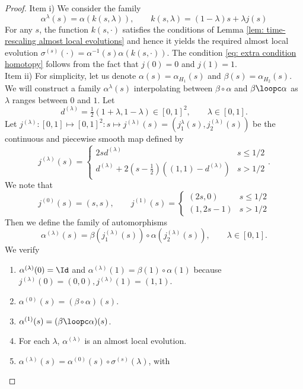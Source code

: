 \begin{proof}
	Item i)  We consider the family
	$$
	\alpha^{\lambda}(s) =      \alpha( k(s,\lambda)), \qquad   k(s,\lambda)=  (1-\lambda)s+ \lambda j(s)
	$$
	For any $s$, the function $k(s,\cdot)$ satisfies the conditions of Lemma \ref{lem: time-rescaling almost local evolutions} and hence it yields the required almost local evolution 
	$\sigma^{(s)}(\cdot)=\alpha^{-1}(s) \alpha(k(s,\cdot))$.
	The condition \eqref{eq: extra condition homotopy} follows from the fact that $j(0)=0$ and $j(1)=1$.\\
	Item ii)  For simplicity, let us denote $\alpha(s)=\alpha_{H_1}(s)$ and $\beta(s)=\alpha_{H_2}(s)$.
	We will construct a family $\alpha^\lambda(s)$ interpolating between $\beta\circ\alpha$ and $\beta \loopc \alpha$ as $\lambda$ ranges between $0$ and $1$. Let 
	$$
	d^{(\lambda)}=\tfrac{1}{2}(1+\lambda,1-\lambda) \in [0,1]^2,\qquad \lambda\in[0,1].
	$$
	Let $j^{(\lambda)}: [0,1] \mapsto [0,1]^2:  s \mapsto j^{(\lambda)}(s)=(j_1^{\lambda}(s),j_2^{(\lambda)}(s)) $ be the continuous and piecewise smooth map defined by 
	$$
	j^{(\lambda)}(s)=
	\begin{cases}
		2s d^{(\lambda)}  &   s\leq 1/2 \\
		d^{(\lambda)} + 2(s-\tfrac{1}{2})\left((1,1) - d^{(\lambda)} \right)  & s>1/2  
	\end{cases}.
	$$
	We note that
	\begin{equation}\label{eq: extreme values for j}
		j^{(0)}(s)=(s,s),\qquad    j^{(1)}(s)=
		\begin{cases}
			(2s,0)  &   s\leq 1/2 \\
			(1,2s-1)  & s>1/2  
		\end{cases}
	\end{equation}
	Then we define the family of automorphisms
	$$ 
	\alpha^{(\lambda)}(s)=   \beta(j_1^{(\lambda)}(s) ) \circ \alpha(j_2^{(\lambda)}(s) ) ,\qquad \lambda\in[0,1].
	$$
	We verify
	\begin{enumerate}
		\item $\alpha^{(\lambda)}(0)= \Id$ and $\alpha^{(\lambda)}(1)= \beta(1 ) \circ \alpha(1 )$ because $j^{(\lambda)}(0)=(0,0), j^{(\lambda)}(1)=(1,1)$.%
		\item $\alpha^{(0)}(s)=  (\beta\circ \alpha)(s )$. 
		\item $\alpha^{(1)}(s)=  (\beta \loopc \alpha)(s)$. 
		\item For each $\lambda$, $\alpha^{(\lambda)}$ is an almost local evolution.
		\item $\alpha^{(\lambda)}(s)=    \alpha^{(0)}(s) \circ \sigma^{(s)}(\lambda) $, with 

\end{enumerate}
\end{proof}
